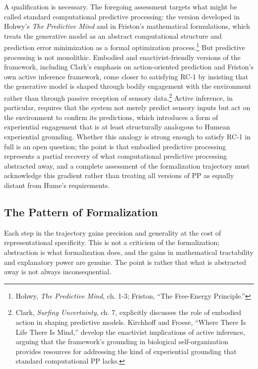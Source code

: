 \documentclass[11pt]{article}
\begin{document}
A qualification is necessary. The foregoing assessment targets what might be called standard computational predictive processing: the version developed in Hohwy's \emph{The Predictive Mind} and in Friston's mathematical formulations, which treats the generative model as an abstract computational structure and prediction error minimization as a formal optimization process.\footnote{Hohwy, \emph{The Predictive Mind}, ch. 1-3; Friston, ``The Free-Energy Principle.''} But predictive processing is not monolithic. Embodied and enactivist-friendly versions of the framework, including Clark's emphasis on action-oriented prediction and Friston's own active inference framework, come closer to satisfying RC-1 by insisting that the generative model is shaped through bodily engagement with the environment rather than through passive reception of sensory data.\footnote{Clark, \emph{Surfing Uncertainty}, ch. 7, explicitly discusses the role of embodied action in shaping predictive models. Kirchhoff and Froese, ``Where There Is Life There Is Mind,'' develop the enactivist implications of active inference, arguing that the framework's grounding in biological self-organization provides resources for addressing the kind of experiential grounding that standard computational PP lacks.} Active inference, in particular, requires that the system not merely predict sensory inputs but act on the environment to confirm its predictions, which introduces a form of experiential engagement that is at least structurally analogous to Humean experiential grounding. Whether this analogy is strong enough to satisfy RC-1 in full is an open question; the point is that embodied predictive processing represents a partial recovery of what computational predictive processing abstracted away, and a complete assessment of the formalization trajectory must acknowledge this gradient rather than treating all versions of PP as equally distant from Hume's requirements.

\subsection{The Pattern of Formalization}

Each step in the trajectory gains precision and generality at the cost of representational specificity. This is not a criticism of the formalization; abstraction is what formalization does, and the gains in mathematical tractability and explanatory power are genuine. The point is rather that what is abstracted away is not always inconsequential.
\end{document}
